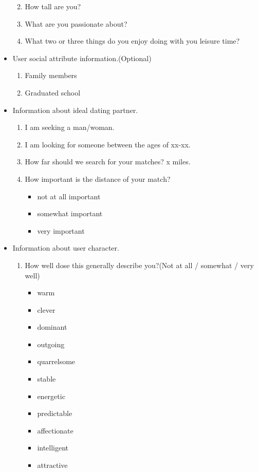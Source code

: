 \begin{appendices}
\begin{itemize}
\begin{enumerate}
\begin{itemize}
			\end{itemize}
			\item How tall are you?
			\item What are you passionate about?
			\item What two or three things do you enjoy doing with you leisure time?
		\end{enumerate}
		\item User social attribute information.(Optional)
		\begin{enumerate}
			\item Family members
			\item Graduated school
		\end{enumerate}
		\item Information about ideal dating partner.
		\begin{enumerate}
			\item I am seeking a man/woman.
			\item I am looking for someone between the ages of xx-xx.
			\item How far should we search for your matches?  x miles.
			\item How important is the distance of your match?
			\begin{itemize}
				\item not at all important
				\item somewhat important
				\item very important
			\end{itemize}
		\end{enumerate}
		\item Information about user character.
		\begin{enumerate}
			\item How well dose this generally describe you?(Not at all / somewhat / very well)
			\begin{itemize}
				\item warm
				\item clever
				\item dominant
				\item outgoing
				\item quarrelsome
				\item stable
				\item energetic
				\item predictable
				\item affectionate
				\item intelligent
				\item attractive

\end{itemize}
\end{enumerate}
\end{itemize}
\end{appendices}
